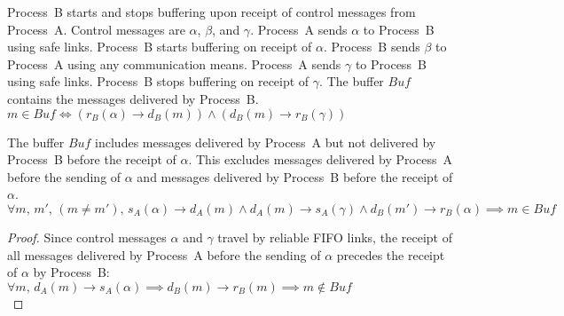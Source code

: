 \begin{definition}
  Process~B starts and stops buffering upon receipt of control messages from
  Process~A. Control messages are $\alpha$, $\beta$, and $\gamma$. Process~A
  sends $\alpha$ to Process~B using safe links. Process~B starts buffering on
  receipt of $\alpha$. Process~B sends $\beta$ to Process~A using any
  communication means. Process~A sends $\gamma$ to Process~B using safe
  links. Process~B stops buffering on receipt of $\gamma$.
  The buffer $Buf$ contains the messages delivered by Process~B.
  $m \in Buf \Longleftrightarrow 
  (r_B(\alpha) \rightarrow d_B(m)) \wedge (d_B(m) \rightarrow r_B(\gamma))$
\end{definition}

\begin{lemma}
  The buffer $Buf$ includes messages delivered by Process~A but not delivered by
  Process~B before the receipt of $\alpha$. This excludes messages delivered by
  Process~A before the sending of $\alpha$ and messages delivered by Process~B
  before the receipt of $\alpha$.
  $\forall m,\,m',\,(m\neq m'),\,
  s_A(\alpha) \rightarrow d_A(m) \wedge
  d_A(m) \rightarrow s_A(\gamma) \wedge
  d_B(m') \rightarrow r_B(\alpha) \implies m \in Buf$
\end{lemma}

\begin{proof}
  Since control messages $\alpha$ and $\gamma$ travel by reliable FIFO links,
  the receipt of all messages delivered by Process~A before the sending of
  $\alpha$ precedes the receipt of $\alpha$ by Process~B:\\
  $\forall m,\, d_A(m) \rightarrow s_A(\alpha) \implies d_B(m) \rightarrow
  r_B(m) \implies m \not\in Buf$\\
\end{proof}

%     

